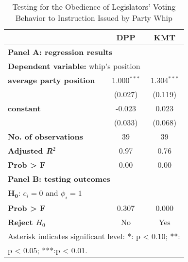 
\begin{table}[tp]
\caption{Testing for the Obedience of Legislators' Voting Behavior
to Instruction Issued by Party Whip
\label{tab:whip-position}}

\centering{}%
\begin{tabular}{lcc}
\toprule 
 & \textbf{DPP} & \textbf{KMT}\tabularnewline
\midrule 
\multicolumn{3}{l}{\textbf{Panel A: regression results}}\tabularnewline
\multicolumn{3}{l}{\textbf{Dependent variable: }whip's position}\tabularnewline
\midrule 

\textbf{average party position} & {1.000$^{***}$} & {1.304$^{***}$}\tabularnewline
 & (0.027) & (0.119)\tabularnewline
\textbf{constant} & -0.023 & 0.023\tabularnewline
 & (0.033) & (0.068)\tabularnewline
\textbf{No. of observations} & 39 & 39\tabularnewline
\textbf{Adjusted \textit{R}$^{2}$} & 0.97 & 0.76\tabularnewline
\textbf{Prob > F} & 0.00 & 0.00\tabularnewline
\midrule
\multicolumn{3}{l}{\textbf{Panel B: testing outcomes}}\tabularnewline
\midrule
\multicolumn{3}{l}{\textbf{$\mathbf{H_{0}}$}:\textbf{ $c_{i}=0$ }and\textbf{ $\phi_{i}=1$}}\tabularnewline
\textbf{Prob > F} & 0.307 & 0.000\tabularnewline
\textbf{Reject $H_{0}$} & No & Yes\tabularnewline
\midrule
\multicolumn{3}{l}{{Asterisk indicates significant level: {*}: p < 0.10;
{*}{*}:}}\tabularnewline
\multicolumn{3}{l}{{p < 0.05; {*}{*}{*}:p < 0.01.}}\tabularnewline
\end{tabular}
\end{table}